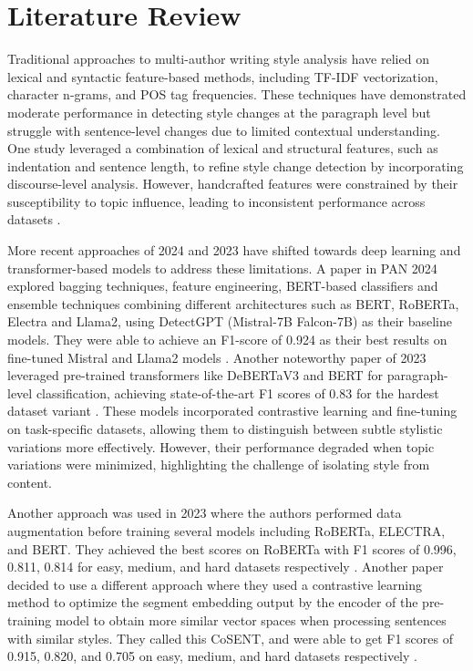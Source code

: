 \section{Literature Review}

Traditional approaches to multi-author writing style analysis have relied on lexical and syntactic feature-based methods, including TF-IDF vectorization, character n-grams, and POS tag frequencies. These techniques have demonstrated moderate performance in detecting style changes at the paragraph level but struggle with sentence-level changes due to limited contextual understanding. One study leveraged a combination of lexical and structural features, such as indentation and sentence length, to refine style change detection by incorporating discourse-level analysis. However, handcrafted features were constrained by their susceptibility to topic influence, leading to inconsistent performance across datasets \cite{paper6} \cite{paper4}.

More recent approaches of 2024 and 2023 have shifted towards deep learning and transformer-based models to address these limitations. A paper in PAN 2024 explored bagging techniques, feature engineering, BERT-based classifiers and ensemble techniques combining different architectures such as BERT, RoBERTa, Electra and Llama2, using DetectGPT (Mistral-7B Falcon-7B) as their baseline models. They were able to achieve an F1-score of 0.924 as their best results on fine-tuned Mistral and Llama2 models \cite{paper1}. Another noteworthy paper of 2023 leveraged pre-trained transformers like DeBERTaV3 and BERT for paragraph-level classification, achieving state-of-the-art F1 scores of 0.83 for the hardest dataset variant \cite{paper3}. These models incorporated contrastive learning and fine-tuning on task-specific datasets, allowing them to distinguish between subtle stylistic variations more effectively. However, their performance degraded when topic variations were minimized, highlighting the challenge of isolating style from content. 

Another approach was used in 2023 where the authors performed data augmentation before training several models including RoBERTa, ELECTRA, and BERT. They achieved the best scores on RoBERTa with F1 scores of 0.996, 0.811, 0.814 for easy, medium, and hard datasets respectively \cite{paper_2023_1}. Another paper decided to use a different approach where they used a contrastive learning method to optimize the segment embedding output by the encoder of the pre-training model to obtain more similar vector spaces when processing sentences with similar styles. They called this CoSENT, and were able to get F1 scores of 0.915, 0.820, and 0.705 on easy, medium, and hard datasets respectively \cite{paper_2023_2}.

